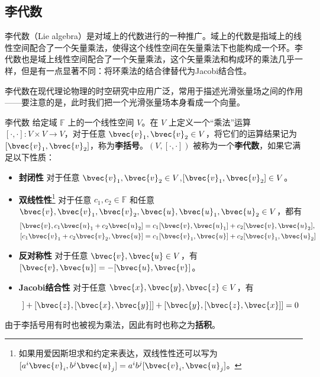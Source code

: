 

\subsection{李代数}

李代数（Lie algebra）是对域上的代数进行的一种推广。域上的代数是指域上的线性空间配合了一个矢量乘法，使得这个线性空间在矢量乘法下也能构成一个环。李代数也是域上线性空间配合了一个矢量乘法，这个矢量乘法和构成环的乘法几乎一样，但是有一点显著不同：将环乘法的结合律替代为Jacobi结合性。

李代数在现代理论物理的时空研究中应用广泛，常用于描述光滑张量场之间的作用——要注意的是，此时我们把一个光滑张量场本身看成一个向量。

\begin{definition}{李代数}\label{LieAlg_def2}
给定域 $\mathbb{F}$ 上的一个线性空间 $V$。在 $V$ 上定义一个“乘法”运算 $[\cdot, \cdot] : V \times V \to V$，对于任意 $\bvec{v}_1, \bvec{v}_2\in V$，将它们的运算结果记为 $[\bvec{v}_1, \bvec{v}_2]$，称为\textbf{李括号}。$(V, [\cdot, \cdot])$ 被称为一个\textbf{李代数}，如果它满足以下性质：

\begin{itemize}
\item \textbf{封闭性} 对于任意 $\bvec{v}_1, \bvec{v}_2\in V$,$[\bvec{v}_1, \bvec{v}_2]\in V$。%

\item \textbf{双线性性}\footnote{如果用爱因斯坦求和约定来表达，双线性性还可以写为 $[a^i\bvec{v}_i, b^j\bvec{u}_j] = a^i b^j[\bvec{v}_i, \bvec{u}_j]$。} 对于任意 $c_1, c_2 \in \mathbb{F}$ 和任意 $\bvec{v}, \bvec{v}_1, \bvec{v}_2, \bvec{u}, \bvec{u}_1, \bvec{u}_2 \in V$，都有 
\begin{equation}
\begin{aligned}
{[\bvec{v}, c_1\bvec{u}_1 + c_2\bvec{u}_2]} &= c_1 [\bvec{v}, \bvec{u}_1] + c_2[\bvec{v}, \bvec{u}_2], \\
[c_1\bvec{v}_1+c_2\bvec{v}_2, \bvec{u}] &= c_1[\bvec{v}_1, \bvec{u}] + c_2[\bvec{v}_1, \bvec{u}_2]
\end{aligned}
\end{equation}

\item \textbf{反对称性} 对于任意 $\bvec{v}, \bvec{u}\in V$，有 $[\bvec{v}, \bvec{u}]=-[\bvec{u}, \bvec{v}]$。

\item \textbf{Jacobi结合性} 对于任意 $\bvec{x}, \bvec{y}, \bvec{z}\in V$，有

\begin{equation}
[\bvec{x}, [\bvec{y}, \bvec{z}]]+[\bvec{z}, [\bvec{x}, \bvec{y}]]+[\bvec{y}, [\bvec{z}, \bvec{x}]]=0
\end{equation}

\end{itemize}

由于李括号用有时也被视为乘法，因此有时也称之为\textbf{括积}。
\end{definition}

